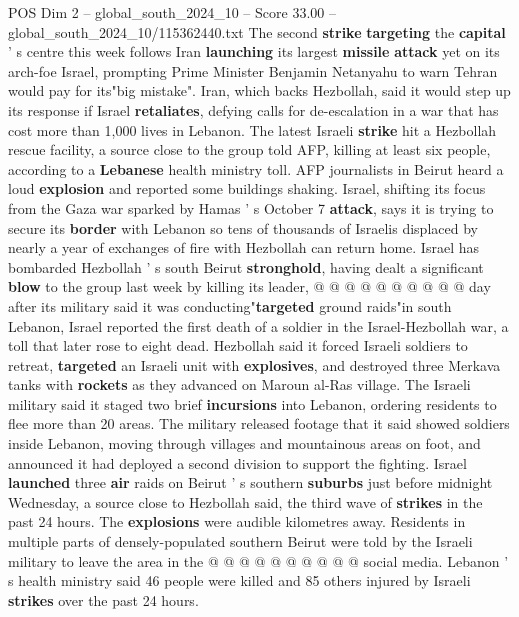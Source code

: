 \begin{textsample}{POS Dim 2 – global\_south\_2024\_10 – Score 33.00 – global\_south\_2024\_10/115362440.txt}  \label{ex:f2_pos_027}
The second \textbf{strike} \textbf{targeting} the \textbf{capital} ' s centre this week follows Iran \textbf{launching} its largest \textbf{missile} \textbf{attack} yet on its arch-foe Israel, prompting Prime Minister Benjamin Netanyahu to warn Tehran would pay for its"big mistake".
Iran, which backs Hezbollah, said it would step up its response if Israel \textbf{retaliates}, defying calls for de-escalation in a war that has cost more than 1,000 lives in Lebanon.
The latest Israeli \textbf{strike} hit a Hezbollah rescue facility, a source close to the group told AFP, killing at least six people, according to a \textbf{Lebanese} health ministry toll.
AFP journalists in Beirut heard a loud \textbf{explosion} and reported some buildings shaking.
Israel, shifting its focus from the Gaza war sparked by Hamas ' s October 7 \textbf{attack}, says it is trying to secure its \textbf{border} with Lebanon so tens of thousands of Israelis displaced by nearly a year of exchanges of fire with Hezbollah can return home.
Israel has bombarded Hezbollah ' s south Beirut \textbf{stronghold}, having dealt a significant \textbf{blow} to the group last week by killing its leader, @ @ @ @ @ @ @ @ @ @ day after its military said it was conducting"\textbf{targeted} ground raids"in south Lebanon, Israel reported the first death of a soldier in the Israel-Hezbollah war, a toll that later rose to eight dead.
Hezbollah said it forced Israeli soldiers to retreat, \textbf{targeted} an Israeli unit with \textbf{explosives}, and destroyed three Merkava tanks with \textbf{rockets} as they advanced on Maroun al-Ras village.
The Israeli military said it staged two brief \textbf{incursions} into Lebanon, ordering residents to flee more than 20 areas.
The military released footage that it said showed soldiers inside Lebanon, moving through villages and mountainous areas on foot, and announced it had deployed a second division to support the fighting.
Israel \textbf{launched} three \textbf{air} raids on Beirut ' s southern \textbf{suburbs} just before midnight Wednesday, a source close to Hezbollah said, the third wave of \textbf{strikes} in the past 24 hours.
The \textbf{explosions} were audible kilometres away.
Residents in multiple parts of densely-populated southern Beirut were told by the Israeli military to leave the area in the @ @ @ @ @ @ @ @ @ @ social media.
Lebanon ' s health ministry said 46 people were killed and 85 others injured by Israeli \textbf{strikes} over the past 24 hours.

\end{textsample}
